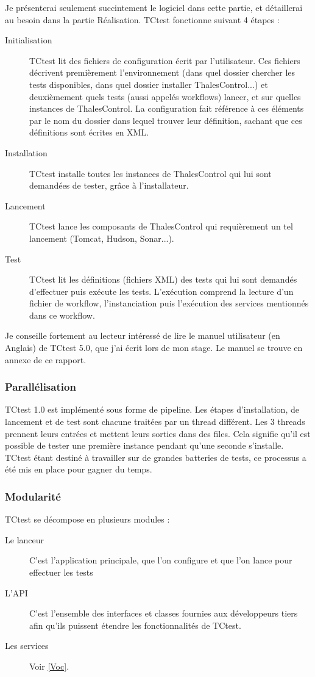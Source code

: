 Je présenterai seulement succintement le logiciel
dans cette partie, et détaillerai au besoin dans la partie Réalisation. TCtest 
fonctionne suivant 4 étapes :
\begin{description}
	\item[Initialisation]{
	TCtest lit des fichiers de configuration écrit par l'utilisateur. Ces 
	fichiers décrivent premièrement l'environnement (dans quel dossier chercher 
	les tests disponibles, dans quel dossier installer ThalesControl...) et 
	deuxièmement quels tests (aussi appelés workflows) lancer, et sur quelles 
	instances de ThalesControl. La configuration fait référence à ces éléments 
	par le nom du dossier dans lequel trouver leur définition, sachant que ces
	définitions sont écrites en XML.}
	\item[Installation]{
	TCtest installe toutes les instances de ThalesControl qui lui sont demandées de 
	tester, grâce à l'installateur.}
	\item[Lancement]{
	TCtest lance les composants de ThalesControl qui requièrement un tel lancement 
	(Tomcat, Hudson, Sonar...).}
	\item[Test]{
	TCtest lit les définitions (fichiers XML) des tests qui lui sont demandés 
	d'effectuer puis exécute les tests. L'exécution comprend la lecture d'un fichier
	de workflow, l'instanciation puis l'exécution des services mentionnés dans ce 
	workflow.}
\end{description}

Je conseille fortement au lecteur intéressé de lire le manuel utilisateur (en 
Anglais) de TCtest 5.0, que j'ai écrit lors de mon stage. Le manuel se trouve en
annexe de ce rapport.

\subsubsection{Parallélisation}
\label{Parallel}

TCtest 1.0 est implémenté sous forme de pipeline. Les étapes d'installation, de 
lancement et de test sont chacune traitées par un thread différent. Les 3 threads 
prennent leurs entrées et mettent leurs sorties dans des files. Cela signifie 
qu'il est possible de tester une première instance pendant qu'une seconde 
s'installe. TCtest étant destiné à travailler sur de grandes batteries de tests,
ce processus a été mis en place pour gagner du temps.

\subsubsection{Modularité}

TCtest se décompose en plusieurs modules :
\begin{description}
	\item[Le lanceur]{C'est l'application principale, que l'on configure et que
	l'on lance pour effectuer les tests}
	\item[L'API]{C'est l'ensemble des interfaces et classes fournies aux 
	développeurs tiers afin qu'ils puissent étendre les fonctionnalités de 
	TCtest.}
	\item[Les services]{Voir \ref{Voc}.}
\end{description}
